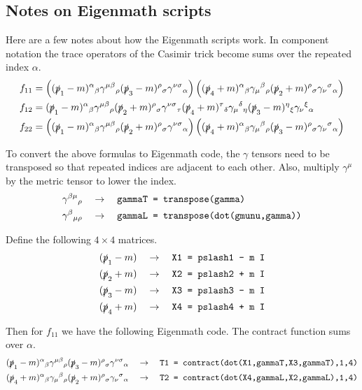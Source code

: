 \documentclass[12pt]{article}
\begin{document}
\subsection*{Notes on Eigenmath scripts}
Here are a few notes about how the Eigenmath scripts work.
In component notation the trace operators of the Casimir trick become sums over the repeated index $\alpha$.
\begin{align*}
f_{11}&=
\left(
(\slashed{p}_1-m)^\alpha{}_\beta
\gamma^{\mu\beta}{}_\rho
(\slashed{p}_3-m)^\rho{}_\sigma
\gamma^{\nu\sigma}{}_\alpha
\right)
\left(
(\slashed{p}_4+m)^\alpha{}_\beta
\gamma_\mu{}^\beta{}_\rho
(\slashed{p}_2+m)^\rho{}_\sigma
\gamma_\nu{}^\sigma{}_\alpha
\right)
\\
f_{12}&=
(\slashed{p}_1-m)^\alpha{}_\beta
\gamma^{\mu\beta}{}_\rho
(\slashed{p}_2+m)^\rho{}_\sigma
\gamma^{\nu\sigma}{}_\tau
(\slashed{p}_4+m)^\tau{}_\delta
\gamma_\mu{}^\delta{}_\eta
(\slashed{p}_3-m)^\eta{}_\xi
\gamma_\nu{}^\xi{}_\alpha
\\
f_{22}&=
\left(
(\slashed{p}_1-m)^\alpha{}_\beta
\gamma^{\mu\beta}{}_\rho
(\slashed{p}_2+m)^\rho{}_\sigma
\gamma^{\nu\sigma}{}_\alpha
\right)
\left(
(\slashed{p}_4+m)^\alpha{}_\beta
\gamma_\mu{}^\beta{}_\rho
(\slashed{p}_3-m)^\rho{}_\sigma
\gamma_\nu{}^\sigma{}_\alpha
\right)
\end{align*}

\noindent
To convert the above formulas to Eigenmath code,
the $\gamma$ tensors need to be transposed
so that repeated indices are adjacent to each other.
Also, multiply $\gamma^\mu$ by the metric tensor to lower the index.
\begin{align*}
\gamma^{\beta\mu}{}_\rho\quad&\rightarrow\quad
\text{\tt gammaT = transpose(gamma)}\\
\gamma^\beta{}_{\mu\rho}\quad&\rightarrow\quad
\text{\tt gammaL = transpose(dot(gmunu,gamma))}
\end{align*}

\noindent
Define the following $4\times4$ matrices.
\begin{align*}
(\slashed{p}_1-m)\quad&\rightarrow\quad\text{\tt X1 = pslash1 - m I}\\
(\slashed{p}_2+m)\quad&\rightarrow\quad\text{\tt X2 = pslash2 + m I}\\
(\slashed{p}_3-m)\quad&\rightarrow\quad\text{\tt X3 = pslash3 - m I}\\
(\slashed{p}_4+m)\quad&\rightarrow\quad\text{\tt X4 = pslash4 + m I}
\end{align*}

\noindent
Then for $f_{11}$ we have the following Eigenmath code.
The contract function sums over $\alpha$.
\begin{align*}
(\slashed{p}_1-m)^\alpha{}_\beta
\gamma^{\mu\beta}{}_\rho
(\slashed{p}_3-m)^\rho{}_\sigma
\gamma^{\nu\sigma}{}_\alpha
\quad&\rightarrow\quad
\text{\tt T1 = contract(dot(X1,gammaT,X3,gammaT),1,4)}\\
(\slashed{p}_4+m)^\alpha{}_\beta
\gamma_\mu{}^\beta{}_\rho
(\slashed{p}_2+m)^\rho{}_\sigma
\gamma_\nu{}^\sigma{}_\alpha
\quad&\rightarrow\quad
\text{\tt T2 = contract(dot(X4,gammaL,X2,gammaL),1,4)}
\end{align*}
\end{document}
